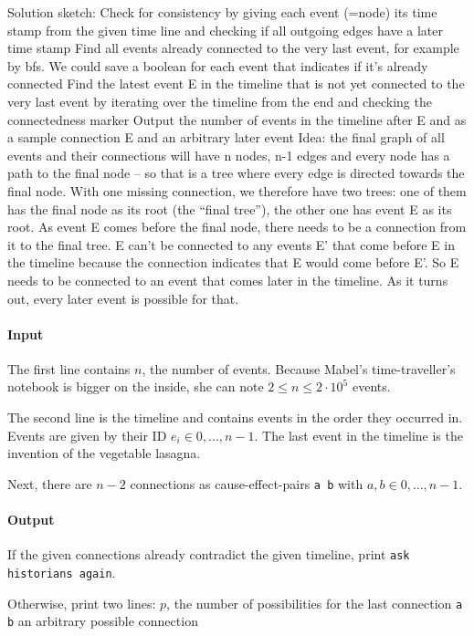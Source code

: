 Solution sketch:
Check for consistency by giving each event (=node) its time stamp from the given time line and checking if all outgoing edges have a later time stamp
Find all events already connected to the very last event, for example by bfs. We could save a boolean for each event that indicates if it’s already connected
Find the latest event E in the timeline that is not yet connected to the very last event by iterating over the timeline from the end and checking the connectedness marker
Output the number of events in the timeline after E and as a sample connection E and an arbitrary later event
Idea: the final graph of all events and their connections will have n nodes, n-1 edges and every node has a path to the final node – so that is a tree where every edge is directed towards the final node. With one missing connection, we therefore have two trees: one of them has the final node as its root (the “final tree”), the other one has event E as its root. As event E comes before the final node, there needs to be a connection from it to the final tree. E can’t be connected to any events E’ that come before E in the timeline because the connection indicates that E would come before E’. So E needs to be connected to an event that comes later in the timeline. As it turns out, every later event is possible for that.

\paragraph*{Input}

The first line contains $n$, the number of events.
Because Mabel's time-traveller’s notebook is bigger on the inside, she can note $2 \leq n \leq 2\cdot 10^5$ events.

The second line is the timeline and contains events in the order they occurred in.
Events are given by their ID $e_i \in {0,...,n-1}$.
The last event in the timeline is the invention of the vegetable lasagna.

Next, there are $n-2$ connections as cause-effect-pairs \texttt{a b} with $a,b \in {0, \ldots ,n-1}$.

\paragraph*{Output}

If the given connections already contradict the given timeline, print \texttt{ask historians again}.

Otherwise, print two lines:
$p$, the number of possibilities for the last connection
\texttt{a b} an arbitrary possible connection

\begin{samples}
\end{samples}


